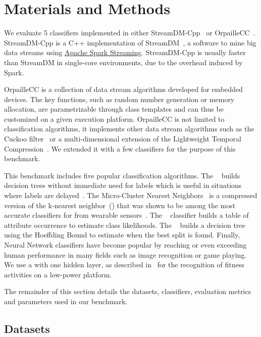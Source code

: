 \section{Materials and Methods}
We evaluate 5 classifiers implemented in either StreamDM-Cpp~\cite{StreamDM-CPP}
or OrpailleCC~\cite{OrpailleCC}.  StreamDM-Cpp is a C++ implementation of
StreamDM~\cite{StreamDM}, a software to mine big data streams using
\href{https://spark.apache.org/streaming/}{Apache Spark Streaming}. StreamDM-Cpp
is usually faster than StreamDM in single-core environments, due to the overhead
induced by Spark.

OrpailleCC is a collection of data stream algorithms developed for embedded
devices. The key functions, such as random number generation or memory
allocation, are parametrizable through class templates and can thus be
customized on a given execution platform.  OrpailleCC is not limited to
classification algorithms, it implements other data stream algorithms such as
the Cuckoo filter~\cite{cuckoo} or a multi-dimensional extension of the
Lightweight Temporal Compression~\cite{multi-ltc}. We extended it with a few
classifiers for the purpose of this benchmark.

This benchmark includes five popular classification algorithms.  The
\mondrianforest~\cite{mondrian2014} builds decision trees without immediate need
for labels which is useful in situations where labels are
delayed~\cite{stream_learning_review}.  The Micro-Cluster Nearest
Neighbors~\cite{mc-nn} is a compressed version of the k-nearest neighbor~(\knn)
that was shown to be among the most accurate classifiers for \har from wearable
sensors~\cite{Janidarmian_2017}. The \naivebayes~\cite{naive_bayes} classifier
builds a table of attribute occurrence to estimate class likelihoods.  The
\hoeffdingtree~\cite{VFDT} builds a decision tree using the Hoeffding Bound to
estimate when the best split is found.  Finally, Neural Network classifiers have
become popular by reaching or even exceeding human performance in many fields
such as image recognition or game playing. We use a \FNN with one hidden layer,
as described in~\cite{omid_2019} for the recognition of fitness activities on a
low-power platform.

The remainder of this section details the datasets, classifiers, evaluation
metrics and parameters used in our benchmark.

\subsection{Datasets}
\label{sec:method-dataset}
